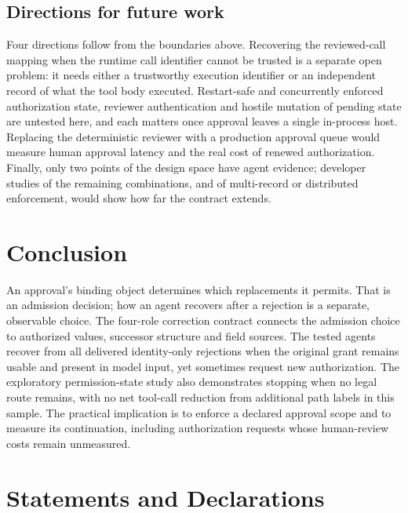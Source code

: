 \documentclass[pdflatex,sn-basic]{sn-jnl}
\begin{document}
\subsection{Directions for future work}\label{future-work}

Four directions follow from the boundaries above. Recovering the reviewed-call mapping when the runtime call identifier cannot be trusted is a separate open problem: it needs either a trustworthy execution identifier or an independent record of what the tool body executed. Restart-safe and concurrently enforced authorization state, reviewer authentication and hostile mutation of pending state are untested here, and each matters once approval leaves a single in-process host. Replacing the deterministic reviewer with a production approval queue would measure human approval latency and the real cost of renewed authorization. Finally, only two points of the design space have agent evidence; developer studies of the remaining combinations, and of multi-record or distributed enforcement, would show how far the contract extends.

\section{Conclusion}\label{conclusion}

An approval's binding object determines which replacements it permits. That is an admission decision; how an agent recovers after a rejection is a separate, observable choice. The four-role correction contract connects the admission choice to authorized values, successor structure and field sources. The tested agents recover from all delivered identity-only rejections when the original grant remains usable and present in model input, yet sometimes request new authorization. The exploratory permission-state study also demonstrates stopping when no legal route remains, with no net tool-call reduction from additional path labels in this sample. The practical implication is to enforce a declared approval scope and to measure its continuation, including authorization requests whose human-review costs remain unmeasured.
\section*{Statements and Declarations}
\end{document}
